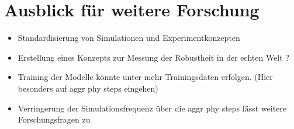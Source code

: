 \section{Ausblick für weitere Forschung}



\begin{itemize}
    \item Standardisierung von Simulationen und Experimentkonzepten
    \item Erstellung eines Konzepts zur Messung der Robustheit in der echten Welt ?
    \item Training der Modelle könnte unter mehr Trainingsdaten erfolgen. (Hier besonders auf aggr phy steps eingehen)
    \item Verringerung der Simulationsfrequenz über die aggr phy steps lässt weitere Forschungsfragen zu
\end{itemize}